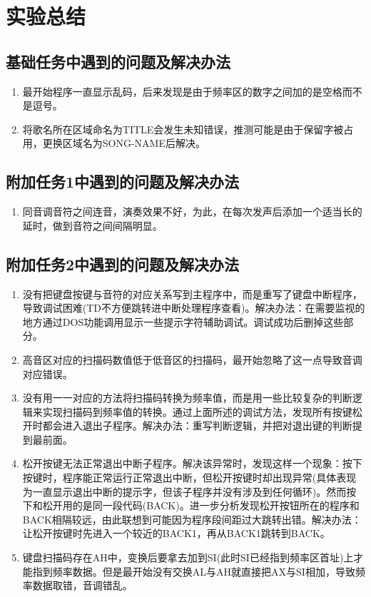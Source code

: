 \documentclass[12pt, a4paper, oneside]{ctexart}
\begin{document}
\section{实验总结}
\subsection{基础任务中遇到的问题及解决办法}
\begin{enumerate}
    \item 最开始程序一直显示乱码，后来发现是由于频率区的数字之间加的是空格而不是逗号。
    \item 将歌名所在区域命名为TITLE会发生未知错误，推测可能是由于保留字被占用，更换区域名为SONG-NAME后解决。
\end{enumerate}
\subsection{附加任务1中遇到的问题及解决办法}
\begin{enumerate}
    \item 同音调音符之间连音，演奏效果不好，为此，在每次发声后添加一个适当长的延时，做到音符之间间隔明显。
\end{enumerate}
\subsection{附加任务2中遇到的问题及解决办法}
\begin{enumerate}
    \item 没有把键盘按键与音符的对应关系写到主程序中，而是重写了键盘中断程序，导致调试困难(TD不方便跳转进中断处理程序查看)。解决办法：在需要监视的地方通过DOS功能调用显示一些提示字符辅助调试。调试成功后删掉这些部分。
    \item 高音区对应的扫描码数值低于低音区的扫描码，最开始忽略了这一点导致音调对应错误。
    \item 没有用一一对应的方法将扫描码转换为频率值，而是用一些比较复杂的判断逻辑来实现扫描码到频率值的转换。通过上面所述的调试方法，发现所有按键松开时都会进入退出子程序。解决办法：重写判断逻辑，并把对退出键的判断提到最前面。
    \item 松开按键无法正常退出中断子程序。解决该异常时，发现这样一个现象：按下按键时，程序能正常运行正常退出中断，但松开按键时却出现异常(具体表现为一直显示退出中断的提示字，但该子程序并没有涉及到任何循环)。然而按下和松开用的是同一段代码(BACK)。进一步分析发现松开按钮所在的程序和BACK相隔较远，由此联想到可能因为程序段间距过大跳转出错。解决办法：让松开按键时先进入一个较近的BACK1，再从BACK1跳转到BACK。
    \item 键盘扫描码存在AH中，变换后要拿去加到SI(此时SI已经指到频率区首址)上才能指到频率数据。但是最开始没有交换AL与AH就直接把AX与SI相加，导致频率数据取错，音调错乱。
\end{enumerate}
\end{document}
